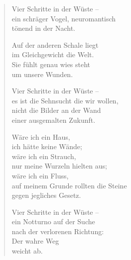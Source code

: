 
\cleartoverso



\begin{verse}

Vier Schritte in der Wüste --\\
ein schräger Vogel, neuromantisch\\
tönend in der Nacht.

Auf der anderen Schale liegt\\
im Gleichgewicht die Welt.\\
Sie fühlt genau wies steht\\
um unsere Wunden.

Vier Schritte in der Wüste --\\
es ist die Sehnsucht die wir wollen,\\
nicht die Bilder an der Wand\\
einer ausgemalten Zukunft.

Wäre ich ein Haus,\\
ich hätte keine Wände;\\
wäre ich ein Strauch,\\
nur meine Wurzeln hielten aus;\\
wäre ich ein Fluss,\\
auf meinem Grunde rollten die Steine\\
gegen jegliches Gesetz.

\clearpage

Vier Schritte in der Wüste --\\
ein Notturno auf der Suche\\
nach der verlorenen Richtung:\\
Der wahre Weg\\
weicht ab.
\end{verse}

\clearpage



